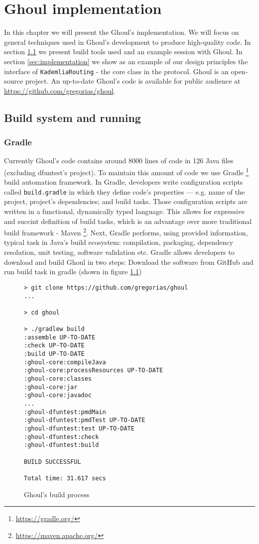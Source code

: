 \chapter{Ghoul implementation}
In this chapter we will present the Ghoul's implementation.
We will focus on general techniques used in Ghoul's development to produce high-quality code.
In section \ref{sec:build} we present build tools used and an example session with Ghoul.
In section \ref{sec:implementation} we show as an example of our design principles the interface of \texttt{KademliaRouting} - the core class in the protocol.
Ghoul is an open-source project.
An up-to-date Ghoul's code is available for public audience at \url{https://github.com/gregorias/ghoul}.

\section{Build system and running}
\label{sec:build}

\subsection{Gradle}
Currently Ghoul's code contains around 8000 lines of code in 126 Java files (excluding dfuntest's project).
To maintain this amount of code we use Gradle \footnote{\url{https://gradle.org/}} build automation framework.
In Gradle, developers write configuration scripts called \texttt{build.gradle} in which they define code's properties --- e.g. name of the project, project's dependencies; and build tasks.
Those configuration scripts are written in a functional, dynamically typed language.
This allows for expressive and succint definition of build tasks, which is an
advantage over more traditional build framework - Maven \footnote{\url{https://maven.apache.org/}}.
Next, Gradle performs, using provided information, typical task in Java's build ecosystem: compilation, packaging, dependency resolution, unit testing, software validation etc.
Gradle allows developers to download and build Ghoul in two steps: Download the software from GitHub and run build task in gradle (shown in figure \ref{fig:ghoul_build_process})

\begin{figure}[tb]
\begin{verbatim}
> git clone https://github.com/gregorias/ghoul
...

> cd ghoul

> ./gradlew build
:assemble UP-TO-DATE
:check UP-TO-DATE
:build UP-TO-DATE
:ghoul-core:compileJava
:ghoul-core:processResources UP-TO-DATE
:ghoul-core:classes
:ghoul-core:jar
:ghoul-core:javadoc
...
:ghoul-dfuntest:pmdMain
:ghoul-dfuntest:pmdTest UP-TO-DATE
:ghoul-dfuntest:test UP-TO-DATE
:ghoul-dfuntest:check
:ghoul-dfuntest:build

BUILD SUCCESSFUL

Total time: 31.617 secs
\end{verbatim}
\caption{Ghoul's build process}
\label{fig:ghoul_build_process}
\end{figure}

